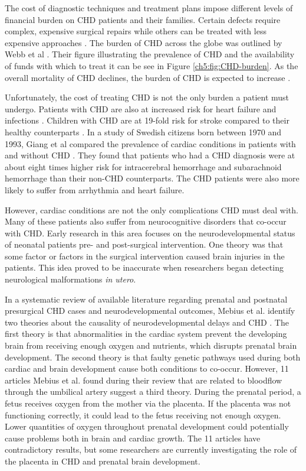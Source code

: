 The cost of diagnostic techniques and treatment plans impose different levels of financial burden on CHD patients and their families. Certain defects require complex, expensive surgical repairs while others can be treated with less expensive approaches \cite{Mozaffarian2016}. The burden of CHD across the globe was outlined by Webb et al \cite{Webb2015}. Their figure illustrating the prevalence of CHD and the availability of funds with which to treat it can be see in Figure \ref{ch5:fig:CHD-burden}. As the overall mortality of CHD declines, the burden of CHD is expected to increase \cite{Mozaffarian2016}.

Unfortunately, the cost of treating CHD is not the only burden a patient must undergo. Patients with CHD are also at increased risk for heart failure and infections \cite{Mozaffarian2016}. Children with CHD are at 19-fold risk for stroke compared to their healthy counterparts \cite{Fox2015}. In a study of Swedish citizens born between 1970 and 1993, Giang et al compared the prevalence of cardiac conditions in patients with and without CHD \cite{Giang2018}. They found that patients who had a CHD diagnosis were at about eight times higher risk for intracerebral hemorrhage and subarachnoid hemorrhage than their non-CHD counterparts. The CHD patients were also more likely to suffer from arrhythmia and heart failure. 


However, cardiac conditions are not the only complications CHD must deal with. Many of these patients also suffer from neurocognitive disorders that co-occur with CHD. Early research in this area focuses on the neurodevelopmental status of neonatal patients pre- and post-surgical intervention. One theory was that some factor or factors in the surgical intervention caused brain injuries in the patients. This idea proved to be inaccurate when researchers began detecting neurological malformations \textit{in utero}.

In a systematic review of available literature regarding prenatal and postnatal presurgical CHD cases and neurodevelopmental outcomes, Mebius et al. identify two theories about the causality of  neurodevelopmental delays and CHD \cite{Mebius2017}. The first theory is that abnormalities in the cardiac system prevent the developing brain from receiving enough oxygen and nutrients, which disrupts prenatal brain development. The second theory is that faulty genetic pathways used during both cardiac and brain development cause both conditions to co-occur. However, 11 articles Mebius et al. found during their review that are related to bloodflow through the umbilical artery suggest a third theory. During the prenatal period, a fetus receives oxygen from the mother via the placenta. If the placenta was not functioning correctly, it could lead to the fetus receiving not enough oxygen. Lower quantities of oxygen throughout prenatal development could potentially cause problems both in brain and cardiac growth. The 11 articles have contradictory results, but some researchers are currently investigating the role of the placenta in CHD and prenatal brain development.

